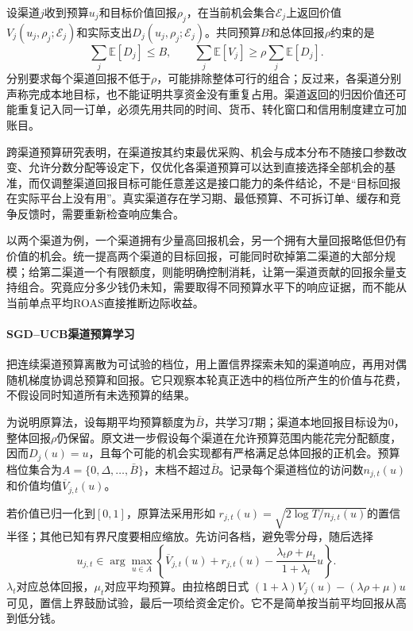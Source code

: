 设渠道$j$收到预算$u_j$和目标价值回报$\rho_j$，在当前机会集合$\mathcal E_j$上返回价值$V_j(u_j,\rho_j;\mathcal E_j)$和实际支出$D_j(u_j,\rho_j;\mathcal E_j)$。共同预算$B$和总体回报$\rho$约束的是
\[
  \sum_j\mathbb{E}[D_j]\leq B,\qquad
  \sum_j\mathbb{E}[V_j]\geq\rho\sum_j\mathbb{E}[D_j].
\]
分别要求每个渠道回报不低于$\rho$，可能排除整体可行的组合；反过来，各渠道分别声称完成本地目标，也不能证明共享资金没有重复占用。渠道返回的归因价值还可能重复记入同一订单，必须先用共同的时间、货币、转化窗口和信用制度建立可加账目。

跨渠道预算研究表明，在渠道按其约束最优采购、机会与成本分布不随接口参数改变、允许分数分配等设定下，仅优化各渠道预算可以达到直接选择全部机会的基准，而仅调整渠道回报目标可能任意差这是接口能力的条件结论，不是“目标回报在实际平台上没有用”。真实渠道存在学习期、最低预算、不可拆订单、缓存和竞争反馈时，需要重新检查响应集合。

以两个渠道为例，一个渠道拥有少量高回报机会，另一个拥有大量回报略低但仍有价值的机会。统一提高两个渠道的目标回报，可能同时砍掉第二渠道的大部分规模；给第二渠道一个有限额度，则能明确控制消耗，让第一渠道贡献的回报余量支持组合。究竟应分多少钱仍未知，需要取得不同预算水平下的响应证据，而不能从当前单点平均ROAS直接推断边际收益。

\paragraph{SGD--UCB渠道预算学习}
\label{sec:rs-advertising-sgd-ucb}

把连续渠道预算离散为可试验的档位，用上置信界探索未知的渠道响应，再用对偶随机梯度协调总预算和回报。它只观察本轮真正选中的档位所产生的价值与花费，不假设同时知道所有未选预算的结果。

为说明原算法，设每期平均预算额度为$\bar B$，共学习$T$期；渠道本地回报目标设为0，整体回报$\rho$仍保留。原文进一步假设每个渠道在允许预算范围内能花完分配额度，因而$D_j(u)=u$，且每个可能的机会实现都有严格满足总体回报的正机会。预算档位集合为$A=\{0,\Delta,\ldots,\bar B\}$，末档不超过$\bar B$。记录每个渠道档位的访问数$n_{j,t}(u)$和价值均值$\overline V_{j,t}(u)$。

若价值已归一化到$[0,1]$，原算法采用形如
$r_{j,t}(u)=\sqrt{2\log T/n_{j,t}(u)}$的置信半径；其他已知有界尺度要相应缩放。先访问各档，避免零分母，随后选择
\begin{equation}
  u_{j,t}\in\arg\max_{u\in A}
    \left\{\overline V_{j,t}(u)+r_{j,t}(u)
        -\frac{\lambda_t\rho+\mu_t}{1+\lambda_t}u\right\}.
  \label{eq:rs-advertising-channel-choice}
\end{equation}
$\lambda_t$对应总体回报，$\mu_t$对应平均预算。由拉格朗日式
$(1+\lambda)V_j(u)-(\lambda\rho+\mu)u$可见，置信上界鼓励试验，最后一项给资金定价。它不是简单按当前平均回报从高到低分钱。

